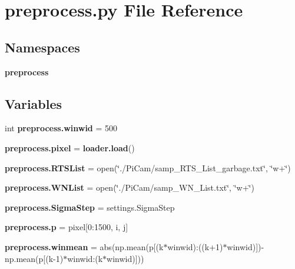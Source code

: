 \section{preprocess.\+py File Reference}
\label{preprocess_8py}
\subsection*{Namespaces}
\begin{DoxyCompactItemize}
\item 
 \textbf{ preprocess}
\end{DoxyCompactItemize}
\subsection*{Variables}
\begin{DoxyCompactItemize}
\item 
int \textbf{ preprocess.\+winwid} = 500
\item 
\textbf{ preprocess.\+pixel} = \textbf{ loader.\+load}()
\item 
\textbf{ preprocess.\+R\+T\+S\+List} = open(\char`\"{}./Pi\+Cam/samp\+\_\+\+R\+T\+S\+\_\+\+List\+\_\+garbage.\+txt\char`\"{}, \char`\"{}w+\char`\"{})
\item 
\textbf{ preprocess.\+W\+N\+List} = open(\char`\"{}./Pi\+Cam/samp\+\_\+\+W\+N\+\_\+\+List.\+txt\char`\"{}, \char`\"{}w+\char`\"{})
\item 
\textbf{ preprocess.\+Sigma\+Step} = settings.\+Sigma\+Step
\item 
\textbf{ preprocess.\+p} = pixel[0\+:1500, i, j]
\item 
\textbf{ preprocess.\+winmean} = abs(np.\+mean(p[(k$\ast$winwid)\+:((k+1)$\ast$winwid)])-\/np.\+mean(p[(k-\/1)$\ast$winwid\+:(k$\ast$winwid)]))
\end{DoxyCompactItemize}

